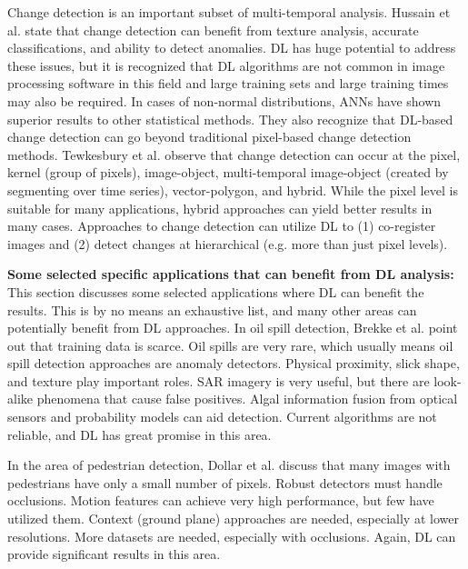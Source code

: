 \documentclass[12pt]{spieman}
\begin{document}
\begin{spacing}{1}
Change detection is an important subset of multi-temporal analysis. Hussain et al. \cite{hussain2013change} state that change detection can benefit from texture analysis, accurate classifications, and ability to detect anomalies. DL has huge potential to address these issues, but it is recognized that DL algorithms are not common in image processing software in this field and large training sets and large training times may also be required. In cases of non-normal distributions, ANNs have shown superior results to other statistical methods. They also recognize that DL-based change detection can go beyond traditional pixel-based change detection methods. Tewkesbury et al. \cite{tewkesbury2015critical} observe that change detection can occur at the pixel, kernel (group of pixels), image-object, multi-temporal image-object (created by segmenting over time series), vector-polygon, and hybrid. While the pixel level is suitable for many applications, hybrid approaches can yield better results in many cases. Approaches to change detection can utilize DL to (1) co-register images and (2) detect changes at hierarchical (e.g. more than just pixel levels).

 
%
%
\textbf{Some selected specific applications that can benefit from DL analysis:} This section discusses some selected applications where DL can benefit the results. This is by no means an exhaustive list, and many other areas can potentially benefit from DL approaches. In oil spill detection, Brekke et al. \cite{brekke2005oil} point out that training data is scarce. Oil spills are very rare, which usually means oil spill detection approaches are anomaly detectors. Physical proximity, slick shape, and texture play important roles. SAR imagery is very useful, but there are look-alike phenomena that cause false positives. Algal information fusion from optical sensors and probability models can aid detection. Current algorithms are not reliable, and DL has great promise in this area.

In the area of pedestrian detection, Dollar et al. \cite{dollar2012pedestrian} discuss that many images with pedestrians have only a small number of pixels. Robust detectors must handle occlusions. Motion features can achieve very high performance, but few have utilized them. Context (ground plane) approaches are needed, especially at lower resolutions. More datasets are needed, especially with occlusions. Again, DL can provide significant results in this area.


\end{spacing}
\end{document}
